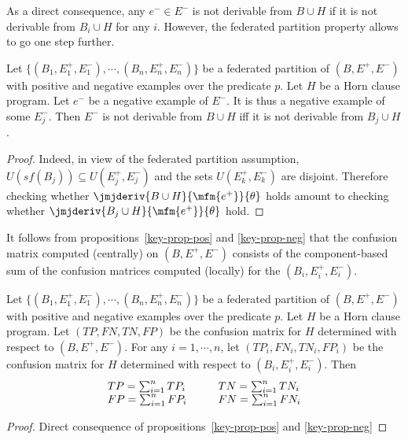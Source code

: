 As a direct consequence, any $e^- \in E^-$ is not derivable from $B \cup H$ if it is not derivable from $B_i \cup H$ for any $i$. However, the federated partition property allows to go one step further.

\begin{proposition}
\label{key-prop-neg}
Let \( \{ (B_1, E_1^+,E_1^-), \cdots, (B_n, E_n^+,E_n^-) \}
\)
be a federated partition of $(B, E^+,E^-)$ with positive and negative examples over the predicate $p$. Let $H$ be a Horn clause program. Let $e^-$ be a negative example of $E^-$. It is thus a negative example of some $E_j^-$. Then $E^-$ is not derivable from $B \cup H$ iff it is not derivable from $B_j \cup H$.
\end{proposition}

\begin{proof} 
Indeed, in view of the federated partition assumption, 
$U(sf(B_j)) \subseteq U(E_j^+,E_j^-)$ and the sets 
$U(E_k^+,E_k^-)$ are disjoint. Therefore checking whether 
\( \jmjderiv{B \cup H}{\mfm{e^+}}{\theta} \)
holds amount to checking whether
\( \jmjderiv{B_j \cup H}{\mfm{e^+}}{\theta} \)
hold. 
\end{proof}


It follows from propositions~\ref{key-prop-pos} and \ref{key-prop-neg} that the 
confusion matrix computed (centrally) on $(B,E^+,E^-)$ consists of the component-based sum of the confusion matrices computed (locally) for the $(B_i,E^+_i,E^-_i)$.

\begin{proposition}
\label{prop-conf-matrices}
Let \( \{ (B_1, E_1^+,E_1^-), \cdots, (B_n, E_n^+,E_n^-) \}
\)
be a federated partition of $(B, E^+,E^-)$ with positive and negative examples over the predicate $p$. Let $H$ be a Horn clause program. Let 
$(TP,FN,TN,FP)$ be the confusion matrix for $H$ determined with respect to $(B, E^+,E^-)$. For any $i=1, \cdots, n$, let $(TP_i,FN_i,TN_i,FP_i)$ be the confusion matrix for $H$ determined with respect to $(B_i, E_i^+,E_i^-)$. Then 
\[ \begin{array}{lcl}
TP = \sum_{i=1}^{n} TP_i    & \hspace*{2ex} & TN = \sum_{i=1}^{n} TN_i \\
FP = \sum_{i=1}^{n} FP_i    & \hspace*{2ex} & FN = \sum_{i=1}^{n} FN_i
\end{array} \]
\end{proposition}

\begin{proof}
Direct consequence of propositions~\ref{key-prop-pos} and \ref{key-prop-neg}
\end{proof}


